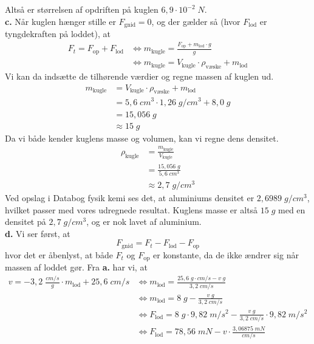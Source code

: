 \documentclass{report}
\begin{document}
Altså er størrelsen af opdriften på kuglen $6,9 \cdot 10 ^{-2}\;\unit{N} $.\\[1ex]
\textbf{c.} 
Når kuglen hænger stille er $F_{\text{gnid} }=0$, og der gælder så (hvor $F _{\text{lod} }$ er tyngdekraften på loddet), at
\begin{equation*}
\begin{split}
  F _{t}=F _{\text{op} }+F _{\text{lod} } &\iff m _{\text{kugle} }=\frac{F _{\text{op} }+m _{\text{lod}}\cdot g}{g}\\
  &\iff m _{\text{kugle} }=V_{\text{kugle}} \cdot \rho _{\text{væske} } + m _{\text{lod} }
\end{split}
\end{equation*}
Vi kan da indsætte de tilhørende værdier og regne massen af kuglen ud.
\begin{equation*}
\begin{split}
  m _{\text{kugle} }&=V_{\text{kugle}} \cdot \rho _{\text{væske} } + m _{\text{lod} }\\
  &=5,6 \;\unit{cm^3} \cdot 1,26 \;\unit{g/cm^3} + 8,0 \;\unit{g} \\
  &=15,056 \;\unit{g} \\
  &\approx 15 \;\unit{g} 
\end{split}
\end{equation*}
Da vi både kender kuglens masse og volumen, kan vi regne dens densitet.
\begin{equation*}
\begin{split}
  \rho _{\text{kugle} }&=\frac{m _{\text{kugle} }}{V _{\text{kugle}}}\\
  &=\frac{15,056 \;\unit{g} }{5,6 \;\unit{cm^3} }\\
  &\approx 2,7 \;\unit{g/cm^3} 
\end{split}
\end{equation*}
Ved opslag i Databog fysik kemi ses det, at aluminiums densitet er $2,6989 \;\unit{g/cm^3} $, hvilket passer med vores udregnede resultat.
Kuglens masse er altså $15 \;\unit{g} $ med en densitet på $2,7 \;\unit{g/cm^3} $, og er nok lavet af aluminium. \\[1ex]
\textbf{d.}
Vi ser først, at 
\[
F _{\text{gnid} }=F_t-F _{\text{lod} } - F _{\text{op} }
\] 
hvor det er åbenlyst, at både $F_t$ og $F _{\text{op} }$ er konstante, da de ikke ændrer sig når massen af loddet gør. 
Fra \textbf{a.} har vi, at
\begin{equation*}
\begin{split}
  v=-3,2 \;\unit{\frac{cm/s}{g}} \cdot m _{\text{lod} } + 25,6 \;\unit{cm/s} &\iff m _{\text{lod} }=\frac{25,6 \;\unit{g\cdot cm/s }-v \;\unit{g}  }{3,2 \;\unit{cm/s} }\\
  &\iff m _{\text{lod} }=8 \;\unit{g} -\frac{v \;\unit{g} }{3,2 \;\unit{cm/s} }\\
  &\iff F_{\text{lod} } =8 \;\unit{g} \cdot 9,82 \;\unit{m/s^2}  -\frac{v \;\unit{g} }{3,2 \;\unit{cm/s} } \cdot 9,82 \;\unit{m/s^2} \\
  &\iff F_{\text{lod} }=78,56 \;\unit{mN} -v \cdot \frac{3,06875 \;\unit{mN} }{\unit{cm/s} }
\end{split}
\end{equation*}
\end{document}
